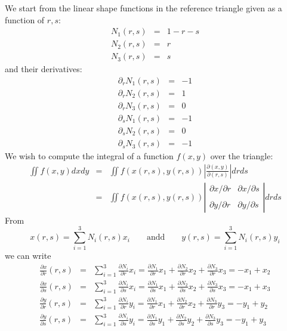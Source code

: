 We start from the linear shape functions in the reference triangle given as a function of $r,s$:
\begin{eqnarray}
N_1(r,s) &=& 1-r-s \\
N_2(r,s) &=& r \\
N_3(r,s) &=& s
\end{eqnarray}
and their derivatives:
\begin{eqnarray}
\partial_r N_1(r,s) &=& -1 \\
\partial_r N_2(r,s) &=& 1 \\
\partial_r N_3(r,s) &=& 0 \\
\partial_s N_1(r,s) &=& -1 \\
\partial_s N_2(r,s) &=& 0\\
\partial_s N_3(r,s) &=& -1
\end{eqnarray}
We wish to compute the integral of a function $f(x,y)$ over the triangle:
\begin{eqnarray}
\iint f(x,y) dx dy 
&=& \iint f(x(r,s),y(r,s)) \left| \frac{\partial (x,y)}{\partial (r,s) } \right|  dr ds \\
&=& \iint f(x(r,s),y(r,s)) 
\left| 
\begin{array}{cc}
\partial x/\partial r & \partial x/\partial s \\ \\
\partial y/\partial r & \partial y/\partial s 
\end{array}
\right|  dr ds 
\end{eqnarray}
From 
\[
x(r,s)=\sum_{i=1}^3 N_i(r,s) x_i 
\qquad \text{andd} \qquad 
y(r,s)=\sum_{i=1}^3 N_i(r,s) y_i 
\]
we can write
\begin{eqnarray}
\frac{\partial x}{\partial r}(r,s)
&=&\sum_{i=1}^3 \frac{\partial N_i}{\partial r} x_i
=\frac{\partial N_1}{\partial r} x_1+\frac{\partial N_2}{\partial r} x_2+\frac{\partial N_3}{\partial r} x_3
=- x_1+ x_2 \nonumber\\
\frac{\partial x}{\partial s}(r,s)
&=&\sum_{i=1}^3 \frac{\partial N_i}{\partial s} x_i
=\frac{\partial N_1}{\partial s} x_1+\frac{\partial N_2}{\partial s} x_2+\frac{\partial N_3}{\partial s} x_3
=- x_1+ x_3
\nonumber\\
\frac{\partial y}{\partial r}(r,s)
&=&\sum_{i=1}^3 \frac{\partial N_i}{\partial r} y_i
=\frac{\partial N_1}{\partial r} x_1+\frac{\partial N_2}{\partial r} x_2+\frac{\partial N_3}{\partial r} y_3
=- y_1+ y_2
\nonumber\\
\frac{\partial y}{\partial s}(r,s)
&=&\sum_{i=1}^3 \frac{\partial N_i}{\partial s} y_i
=\frac{\partial N_1}{\partial s} y_1+\frac{\partial N_2}{\partial s} y_2+\frac{\partial N_3}{\partial s} y_3
=- y_1+ y_3
\end{eqnarray}
